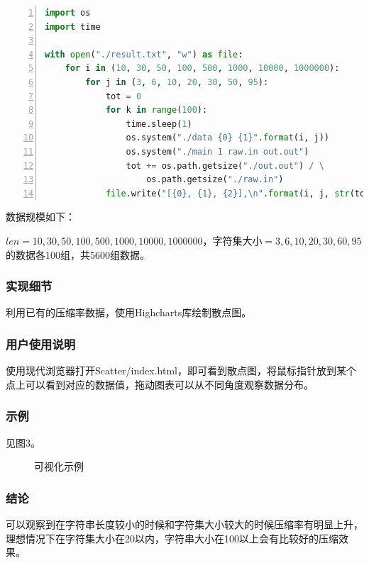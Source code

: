 \documentclass{article}
\begin{document}
\begin{lstlisting}[language={python},
    numbers=left,
    numberstyle=\tiny\consolas,
    basicstyle=\small\consolas]
import os
import time

with open("./result.txt", "w") as file:
    for i in (10, 30, 50, 100, 500, 1000, 10000, 1000000):
        for j in (3, 6, 10, 20, 30, 50, 95):
            tot = 0
            for k in range(100):
                time.sleep(1)
                os.system("./data {0} {1}".format(i, j))
                os.system("./main 1 raw.in out.out")
                tot += os.path.getsize("./out.out") / \
                    os.path.getsize("./raw.in")
            file.write("[{0}, {1}, {2}],\n".format(i, j, str(tot / 10)[:9]))
\end{lstlisting}

数据规模如下：

$len=10,30,50,100,500,1000,10000,1000000$，字符集大小$=3,6,10,20,30,60,95$的数据各100组，共5600组数据。

\subsubsection{实现细节}

利用已有的压缩率数据，使用Highcharts库绘制散点图。

\subsubsection{用户使用说明}

使用现代浏览器打开Scatter/index.html，即可看到散点图，将鼠标指针放到某个点上可以看到对应的数据值，拖动图表可以从不同角度观察数据分布。

\subsubsection{示例}

见图3。

\begin{figure}[htbp]
    
    
    \caption{可视化示例}
    
\end{figure}

\subsubsection{结论}

可以观察到在字符串长度较小的时候和字符集大小较大的时候压缩率有明显上升，理想情况下在字符集大小在20以内，字符串大小在100以上会有比较好的压缩效果。
\end{document}

